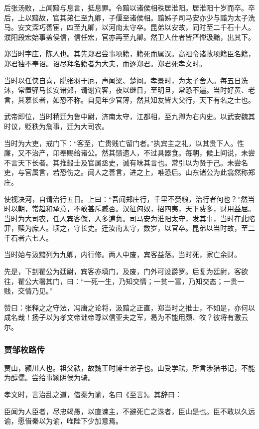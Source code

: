 \documentclass[]{article}
\begin{document}
后张汤败，上闻黯与息言，抵息罪。令黯以诸侯相秩居淮阳。居淮阳十岁而卒。卒后，上以黯故，官其弟仁至九卿，子偃至诸侯相。黯姊子司马安亦少与黯为太子洗马。安文深巧善宦，四至九卿，以河南太守卒。昆弟以安故，同时至二千石十人。濮阳段宏始事盖侯信，信任宏，官亦再至九卿。然卫人仕者皆严惮汲黯，出其下。

郑当时字庄，陈人也。其先郑君尝事项籍，籍死而属汉。高祖令诸故项籍臣名籍，郑君独不奉诏。诏尽拜名籍者为大夫，而逐郑君。郑君死孝文时。

当时以任侠自喜，脱张羽于厄，声闻梁、楚间。孝景时，为太子舍人。每五日洗沐，常置驿马长安诸郊，请谢宾客，夜以继日，至明旦，常恐不遍。当时好黄、老言，其慕长者，如恐不称。自见年少官薄，然其知友皆大父行，天下有名之士也。

武帝即位，当时稍迁为鲁中尉，济南太守，江都相，至九卿为右内史。以武安魏其时议，贬秩为詹事，迁为大司农。

当时为大吏，戒门下：``客至，亡贵贱亡留门者。''执宾主之礼，以其贵下人。性廉，又不治产，卬奉赐给诸公。然其馈遗人，不过具器食。每朝，候上间说，未尝不言天下长者。其推毂士及官属丞史，诚有味其言也。常引以为贤于己。未尝名吏，与官属言，若恐伤之。闻人之善言，进之上，唯恐后。山东诸公为此翕然称郑庄。

使视决河，自请治行五日。上曰：``吾闻郑庄行，千里不赍粮，治行者何也？''然当时以朝，常趋和承意，不敢甚斥臧否。汉征匈奴，招四夷，天下费多，财用益屈。当时为大司农，任人宾客僦，入多逋负。司马安为淮阳太守，发其事，当时在此陷罪，赎为庶人。顷之，守长史。迁汝南太守，数岁，以官卒。昆弟以当时故，至二千石者六七人。

当时始与汲黯列为九卿，内行修。两人中废，宾客益落。当时死，家亡余财。

先是，下刲翟公为廷尉，宾客亦填门，及废，门外可设爵罗。后复为廷尉，客欲往，翟公大署其门，曰：``一死一生，乃知交情；一贫一富，乃知交态；一贵一贱，交情乃见。''

赞曰：张释之之守法，冯唐之论将，汲黯之正直，郑当时之推士，不如是，亦何以成名哉！扬子以为孝文帝诎帝尊以信亚夫之军，曷为不能用颇、牧？彼将有激云尔。

\hypertarget{header-n4229}{%
\subsubsection{贾邹枚路传}\label{header-n4229}}

贾山，颍川人也。祖父祛，故魏王时博士弟子也。山受学祛，所言涉猎书记，不能为醇儒。尝给事颍阴侯为骑。

孝文时，言治乱之道，借秦为谕，名曰《至言》。其辞曰：

臣闻为人臣者，尽忠竭愚，以直谏主，不避死亡之诛者，臣山是也。臣不敢以久远谕，愿借秦以为谕，唯陛下少加意焉。
\end{document}
